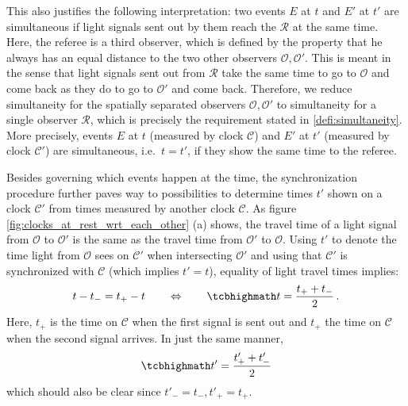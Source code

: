 This also justifies the following interpretation: two events $E$ at $t$ and $E'$ at $t'$ are simultaneous if light signals sent out by them reach the  $\mathcal{R}$ at the same time. Here, the referee is a third observer, which is defined by the property that he always has an equal distance to the two other observers $\mathcal{O}, \mathcal{O}'$. This is meant in the sense that light signals sent out from $\mathcal{R}$ take the same time to go to $\mathcal{O}$ and come back as they do to go to $\mathcal{O}'$ and come back. Therefore, we reduce simultaneity for the spatially separated observers $\mathcal{O}, \mathcal{O}'$ to simultaneity for a single observer $\mathcal{R}$, which is precisely the requirement stated in \ref{defi:simultaneity}. More precisely, events $E$ at $t$ (measured by clock $\mathcal{C}$) and $E'$ at $t'$ (measured by clock $\mathcal{C}'$) are simultaneous, i.e.~$t = t'$, if they show the same time to the referee.


Besides governing which events happen at the time, the synchronization procedure further paves way to possibilities to determine times $t'$ shown on a clock $\mathcal{C}'$ from times measured by another clock $\mathcal{C}$. As figure \ref{fig:clocks_at_rest_wrt_each_other} (a) shows, the travel time of a light signal from $\mathcal{O}$ to $\mathcal{O}'$ is the same as the travel time from $\mathcal{O}'$ to $\mathcal{O}$. Using $t'$ to denote the time light from $\mathcal{O}$ sees on $\mathcal{C}'$ when intersecting $\mathcal{O}'$ and using that $\mathcal{C}'$ is synchronized with $\mathcal{C}$ (which implies $t' = t$), equality of light travel times implies:
\begin{equation}\label{eq:time_synchr}
t - t_- = t_+ - t
\qquad \Leftrightarrow \qquad
\eqbox{
t = \frac{t_+ + t_-}{2}
} \, .
\end{equation}
Here, $t_+$ is the time on $\mathcal{C}$ when the first signal is sent out and $t_+$ the time on $\mathcal{C}$ when the second signal arrives. In just the same manner,
\begin{equation}
\eqbox{
t' = \frac{t'_+ + t'_-}{2}
}
\end{equation}
which should also be clear since $t'_- = t_-, t'_+ = t_+$.\\


